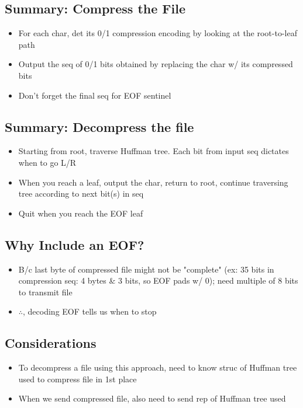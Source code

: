 \documentclass{article}
\begin{document}
\begin{multicols}{2}
\subsection{Summary: Compress the File}
    \begin{itemize}
        \item For each char, det its 0/1 compression encoding by looking at the root-to-leaf path
        \item Output the seq of 0/1 bits obtained by replacing the char w/ its compressed bits
        \item Don't forget the final seq for EOF sentinel
        \end{itemize}

\subsection{Summary: Decompress the file}
    \begin{itemize}
        \item Starting from root, traverse Huffman tree. Each bit from input seq dictates when to go L/R
        \item When you reach a leaf, output the char, return to root, continue traversing tree according to next bit(s) in seq
        \item Quit when you reach the EOF leaf
    \end{itemize}

\subsection{Why Include an EOF?}
    \begin{itemize}
        \item B/c last byte of compressed file might not be "complete" (ex: 35 bits in compression seq: 4 bytes \& 3 bits, so EOF pads w/ 0); need multiple of 8 bits to transmit file
        \item $\therefore$, decoding EOF tells us when to stop
    \end{itemize}

\subsection{Considerations}
    \begin{itemize}
        \item To decompress a file using this approach, need to know struc of Huffman tree used to compress file in 1st place
        \item When we send compressed file, also need to send rep of Huffman tree used
    \end{itemize}


\end{multicols}
\end{document}
